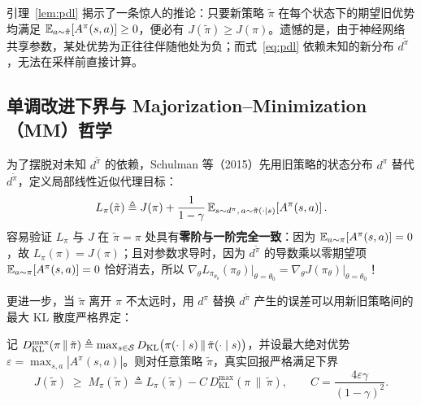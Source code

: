 引理~\ref{lem:pdl} 揭示了一条惊人的推论：只要新策略 $\tilde{\pi}$ 在每个状态下的期望旧优势均满足 $\mathbb{E}_{a \sim \tilde{\pi}}[A^\pi(s, a)] \ge 0$，便必有 $J(\tilde{\pi}) \ge J(\pi)$。遗憾的是，由于神经网络共享参数，某处优势为正往往伴随他处为负；而式~\eqref{eq:pdl} 依赖未知的新分布 $d^{\tilde{\pi}}$，无法在采样前直接计算。

\subsection{单调改进下界与 Majorization--Minimization（MM）哲学}

为了摆脱对未知 $d^{\tilde{\pi}}$ 的依赖，Schulman 等（2015）先用旧策略的状态分布 $d^\pi$ 替代 $d^{\tilde{\pi}}$，定义局部线性近似代理目标：
\begin{equation}
  L_\pi(\tilde{\pi}) \triangleq J(\pi) + \frac{1}{1-\gamma}\,\mathbb{E}_{s \sim d^\pi,\, a \sim \tilde{\pi}(\cdot \mid s)}\!\left[A^\pi(s, a)\right].
  \label{eq:trpo-local-surrogate}
\end{equation}
容易验证 $L_\pi$ 与 $J$ 在 $\tilde{\pi} = \pi$ 处具有\textbf{零阶与一阶完全一致}：因为 $\mathbb{E}_{a\sim\pi}[A^\pi(s,a)] = 0$，故 $L_\pi(\pi) = J(\pi)$；且对参数求导时，因为 $d^{\tilde{\pi}}$ 的导数乘以零期望项 $\mathbb{E}_{a\sim\pi}[A^\pi(s,a)] = 0$ 恰好消去，所以 $\nabla_\theta L_{\pi_{\theta_0}}(\pi_\theta)\big|_{\theta=\theta_0} = \nabla_\theta J(\pi_\theta)\big|_{\theta=\theta_0}$！

更进一步，当 $\tilde{\pi}$ 离开 $\pi$ 不太远时，用 $d^\pi$ 替换 $d^{\tilde{\pi}}$ 产生的误差可以用新旧策略间的最大 KL 散度严格界定：

\begin{thmBox}
\begin{theorem}
\label{thm:trpo-bound}
记 $D_{\mathrm{KL}}^{\max}(\pi \,\|\, \tilde{\pi}) \triangleq \max_{s \in \mathcal{S}} D_{\mathrm{KL}}\big(\pi(\cdot \mid s) \,\|\, \tilde{\pi}(\cdot \mid s)\big)$，并设最大绝对优势 $\varepsilon = \max_{s,a} |A^\pi(s, a)|$。则对任意策略 $\tilde{\pi}$，真实回报严格满足下界
\begin{equation}
  J(\tilde{\pi}) \;\ge\; M_\pi(\tilde{\pi}) \triangleq L_\pi(\tilde{\pi}) - C\, D_{\mathrm{KL}}^{\max}(\pi \,\|\, \tilde{\pi}),
  \qquad C = \frac{4\varepsilon \gamma}{(1 - \gamma)^2}.
  \label{eq:trpo-mm-bound}
\end{equation}
\end{theorem}
\end{thmBox}

